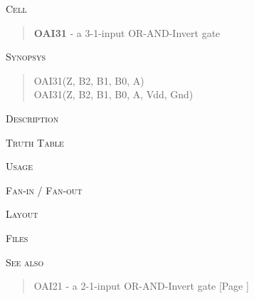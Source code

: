 
\label{OAI31}
\textsc{Cell}
\begin{quote}
    \textbf{OAI31} - a 3-1-input OR-AND-Invert gate
\end{quote}

\textsc{Synopsys}
\begin{quote}
    OAI31(Z, B2, B1, B0, A) \\
    OAI31(Z, B2, B1, B0, A, Vdd, Gnd)
\end{quote}

\textsc{Description}

%

\textsc{Truth Table}


\textsc{Usage}

\textsc{Fan-in / Fan-out}

\textsc{Layout}

\textsc{Files}

\textsc{See also}
\begin{quote}
    OAI21 - a 2-1-input OR-AND-Invert gate [Page \pageref{OAI21}]
\end{quote}
